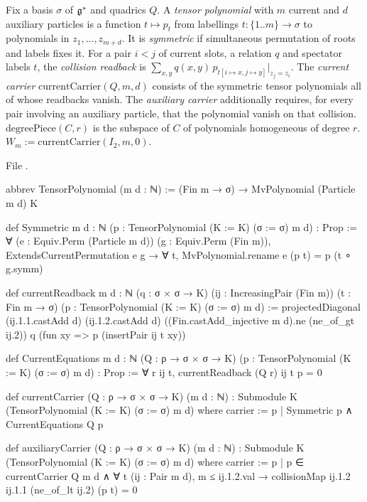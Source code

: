\begin{definition}\label{l24:def:carrier}
Fix a basis $\sigma$ of $\mathfrak g^*$ and quadrics $Q$. A \emph{tensor polynomial} with $m$ current and $d$
auxiliary particles is a function $t\mapsto p_t$ from labellings $t:\{1..m\}\to\sigma$ to polynomials in
$z_1,\dots,z_{m+d}$. It is \emph{symmetric} if simultaneous permutation of roots and labels fixes it. For a
pair $i<j$ of current slots, a relation $q$ and spectator labels $t$, the \emph{collision readback} is
$\sum_{x,y}q(x,y)\,p_{t[i\mapsto x,j\mapsto y]}|_{z_j=z_i}$. The \emph{current carrier}
$\mathrm{currentCarrier}(Q,m,d)$ consists of the symmetric tensor polynomials all of whose readbacks vanish.
The \emph{auxiliary carrier} additionally requires, for every pair involving an auxiliary particle, that the
polynomial vanish on that collision. $\mathrm{degreePiece}(C,r)$ is the subspace of $C$ of polynomials
homogeneous of degree $r$. $W_m:=\mathrm{currentCarrier}(I_2,m,0)$.
\end{definition}
\noindent File .
\begin{leancode}
abbrev TensorPolynomial (m d : ℕ) :=
  (Fin m → σ) → MvPolynomial (Particle m d) K

def Symmetric {m d : ℕ} (p : TensorPolynomial (K := K) (σ := σ) m d) : Prop :=
  ∀ (e : Equiv.Perm (Particle m d)) (g : Equiv.Perm (Fin m)),
    ExtendsCurrentPermutation e g → ∀ t,
      MvPolynomial.rename e (p t) = p (t ∘ g.symm)

def currentReadback {m d : ℕ} (q : σ × σ → K)
    (ij : IncreasingPair (Fin m)) (t : Fin m → σ)
    (p : TensorPolynomial (K := K) (σ := σ) m d) :=
  projectedDiagonal (ij.1.1.castAdd d) (ij.1.2.castAdd d)
    ((Fin.castAdd_injective m d).ne (ne_of_gt ij.2)) q
    (fun xy => p (insertPair ij t xy))

def CurrentEquations {m d : ℕ} (Q : ρ → σ × σ → K)
    (p : TensorPolynomial (K := K) (σ := σ) m d) : Prop :=
  ∀ r ij t, currentReadback (Q r) ij t p = 0

def currentCarrier (Q : ρ → σ × σ → K) (m d : ℕ) :
    Submodule K (TensorPolynomial (K := K) (σ := σ) m d) where
  carrier := {p | Symmetric p ∧ CurrentEquations Q p}

def auxiliaryCarrier (Q : ρ → σ × σ → K) (m d : ℕ) :
    Submodule K (TensorPolynomial (K := K) (σ := σ) m d) where
  carrier := {p | p ∈ currentCarrier Q m d ∧
    ∀ t (ij : Pair m d), m ≤ ij.1.2.val →
      collisionMap ij.1.2 ij.1.1 (ne_of_lt ij.2) (p t) = 0}
\end{leancode}
